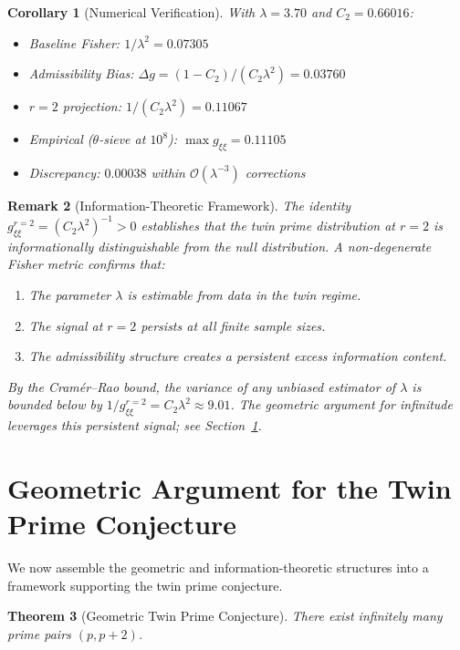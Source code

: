 \documentclass[12pt]{article}
\newtheorem{theorem}{Theorem}[section]
\newtheorem{corollary}[theorem]{Corollary}
\newtheorem{remark}[theorem]{Remark}
\begin{document}
\begin{corollary}[Numerical Verification]
With $\lambda = 3.70$ and $C_2 = 0.66016$:
\begin{itemize}
  \item Baseline Fisher: $1/\lambda^2 = 0.07305$
  \item Admissibility Bias: $\Delta g = (1-C_2)/(C_2\lambda^2) = 0.03760$
  \item $r=2$ projection: $1/(C_2\lambda^2) = 0.11067$
  \item Empirical ($\theta$-sieve at $10^8$): $\max g_{\xi\xi} = 0.11105$
  \item Discrepancy: $0.00038$ within $\mathcal{O}(\lambda^{-3})$ corrections
\end{itemize}
\end{corollary}

\begin{remark}[Information-Theoretic Framework]
The identity $g_{\xi\xi}^{r=2} = (C_2\lambda^2)^{-1} > 0$ establishes that the
twin prime distribution at $r=2$ is \textit{informationally distinguishable}
from the null distribution. A non-degenerate Fisher metric confirms that:
\begin{enumerate}
  \item The parameter $\lambda$ is estimable from data in the twin regime.
  \item The signal at $r=2$ persists at all finite sample sizes.
  \item The admissibility structure creates a persistent excess information content.
\end{enumerate}
By the Cram\'er--Rao bound, the variance of any unbiased estimator of $\lambda$
is bounded below by $1/g_{\xi\xi}^{r=2} = C_2\lambda^2 \approx 9.01$. The
geometric argument for infinitude leverages this persistent signal; see
Section~\ref{sec:geometric_argument}.
\end{remark}

\section{Geometric Argument for the Twin Prime Conjecture}
\label{sec:geometric_argument}

We now assemble the geometric and information-theoretic structures into a
framework supporting the twin prime conjecture.

\begin{theorem}[Geometric Twin Prime Conjecture]
There exist infinitely many prime pairs $(p, p+2)$.
\end{theorem}
\end{document}
